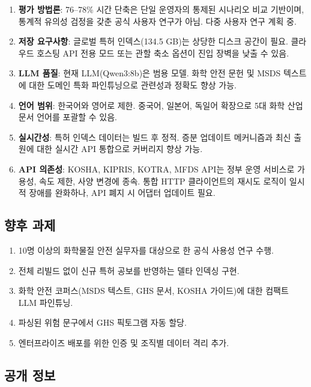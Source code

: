 \documentclass[preprint,12pt]{elsarticle}
\begin{document}
\begin{enumerate}
  \item \textbf{평가 방법론}: 76--78\% 시간 단축은 단일 운영자의 통제된 시나리오 비교 기반이며, 통계적 유의성 검정을 갖춘 공식 사용자 연구가 아님. 다중 사용자 연구 계획 중.
  \item \textbf{저장 요구사항}: 글로벌 특허 인덱스(134.5 GB)는 상당한 디스크 공간이 필요. 클라우드 호스팅 API 전용 모드 또는 관할 축소 옵션이 진입 장벽을 낮출 수 있음.
  \item \textbf{LLM 품질}: 현재 LLM(Qwen3:8b)은 범용 모델. 화학 안전 문헌 및 MSDS 텍스트에 대한 도메인 특화 파인튜닝으로 관련성과 정확도 향상 가능.
  \item \textbf{언어 범위}: 한국어와 영어로 제한. 중국어, 일본어, 독일어 확장으로 5대 화학 산업 문서 언어를 포괄할 수 있음.
  \item \textbf{실시간성}: 특허 인덱스 데이터는 빌드 후 정적. 증분 업데이트 메커니즘과 최신 출원에 대한 실시간 API 통합으로 커버리지 향상 가능.
  \item \textbf{API 의존성}: KOSHA, KIPRIS, KOTRA, MFDS API는 정부 운영 서비스로 가용성, 속도 제한, 사양 변경에 종속. 통합 HTTP 클라이언트의 재시도 로직이 일시적 장애를 완화하나, API 폐지 시 어댑터 업데이트 필요.
\end{enumerate}

\subsection{향후 과제}

\begin{enumerate}
  \item 10명 이상의 화학물질 안전 실무자를 대상으로 한 공식 사용성 연구 수행.
  \item 전체 리빌드 없이 신규 특허 공보를 반영하는 델타 인덱싱 구현.
  \item 화학 안전 코퍼스(MSDS 텍스트, GHS 문서, KOSHA 가이드)에 대한 컴팩트 LLM 파인튜닝.
  \item 파싱된 위험 문구에서 GHS 픽토그램 자동 할당.
  \item 엔터프라이즈 배포를 위한 인증 및 조직별 데이터 격리 추가.
\end{enumerate}

\subsection{공개 정보}
\end{document}

